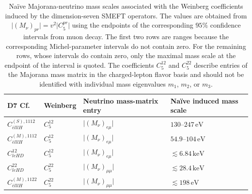 \begin{table}[htbp]
    \centering
    \renewcommand{\arraystretch}{1.25}
    \begin{tabular}{llll}
        \toprule
        D7 Cf.
        & Weinberg
        & Neutrino mass-matrix entry
        & Naïve induced mass scale
        \\
        \midrule
        $C_{\bar e lllH}^{(S),1112}$
        & $C_5^{12}$
        & $\lvert(M_\nu)_{e\mu}\rvert$
        & $130\text{--}247\,\mathrm{eV}$
        \\
        $C_{\bar e lllH}^{(M),1112}$
        & $C_5^{12}$
        & $\lvert(M_\nu)_{e\mu}\rvert$
        & $54.9\text{--}104\,\mathrm{eV}$
        \\
        $C_{leHD}^{12}$
        & $C_5^{12}$
        & $\lvert(M_\nu)_{e\mu}\rvert$
        & $\lesssim 6.84\,\mathrm{keV}$
        \\
        $C_{leHD}^{22}$
        & $C_5^{22}$
        & $\lvert(M_\nu)_{\mu\mu}\rvert$
        & $\lesssim 28.4\,\mathrm{keV}$
        \\
        $C_{\bar e lllH}^{(M),1122}$
        & $C_5^{22}$
        & $\lvert(M_\nu)_{\mu\mu}\rvert$
        & $\lesssim 198\,\mathrm{eV}$
        \\
        \bottomrule
    \end{tabular}
    \caption{%
        Naïve Majorana-neutrino mass scales associated with the
        Weinberg coefficients induced by the dimension-seven SMEFT
        operators. The values are obtained from
        $\lvert(M_\nu)_{pr}\rvert=v^2\lvert C_5^{pr}\rvert$
        using the endpoints of the corresponding $95\%$ confidence
        intervals from muon decay. The first two rows are ranges because the corresponding
        Michel-parameter intervals do not contain zero. For the remaining
        rows, whose intervals do contain zero, only the maximal mass scale
        at the endpoint of the interval is quoted. The coefficients
        $C_5^{12}$ and $C_5^{22}$ describe entries of the Majorana mass
        matrix in the charged-lepton flavor basis and should not be
        identified with individual mass eigenvalues $m_1$, $m_2$, or $m_3$.
    }
    \label{tab:induced-neutrino-masses}
\end{table}

